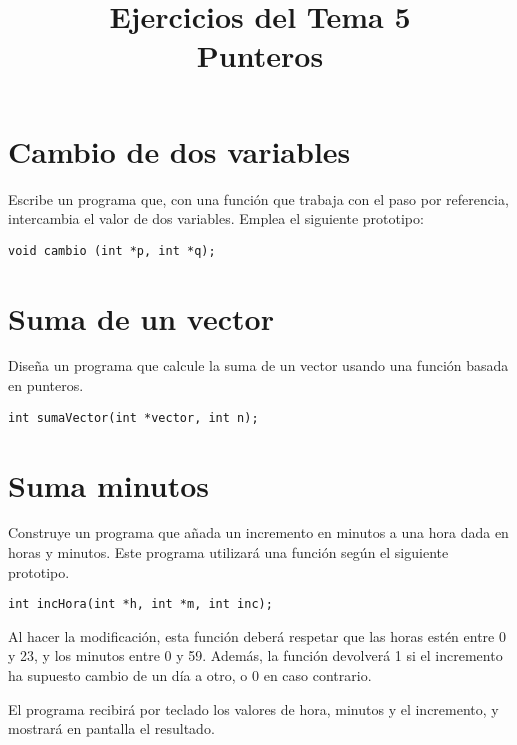 \documentclass[a4paper]{article}
\date{}
\title{Ejercicios del Tema 5\\\medskip
\large Punteros}
\begin{document}
\maketitle


\section{Cambio de dos variables}
\label{sec:orgdff0ad7}

Escribe un programa que, con una función que trabaja con el paso por referencia, intercambia el valor de dos variables. Emplea el siguiente prototipo:

\lstset{language=C,label= ,caption= ,captionpos=b,numbers=none}
\begin{lstlisting}
void cambio (int *p, int *q);
\end{lstlisting}


\section{Suma de un vector}
\label{sec:orgd517bcd}

Diseña un programa que calcule la suma de un vector usando una función basada en punteros.

\lstset{language=C,label= ,caption= ,captionpos=b,numbers=none}
\begin{lstlisting}
int sumaVector(int *vector, int n);
\end{lstlisting}

\section{Suma minutos}
\label{sec:orgb4efba8}
Construye un programa que añada un incremento en minutos a una hora dada en horas y minutos. Este programa utilizará una función según el siguiente prototipo. 

\lstset{language=C,label= ,caption= ,captionpos=b,numbers=none}
\begin{lstlisting}
int incHora(int *h, int *m, int inc);
\end{lstlisting}
Al hacer la modificación, esta función deberá respetar que las horas estén entre 0 y 23, y los minutos entre 0 y 59. Además, la función devolverá 1 si el incremento ha supuesto cambio de un día a otro, o 0 en caso contrario.

El programa recibirá por teclado los valores de hora, minutos y el incremento, y mostrará en pantalla el resultado.
\end{document}

